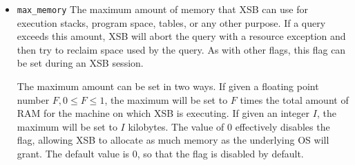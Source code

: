 \begin{description}
\begin{itemize}
\item {\tt max\_memory} The maximum amount of memory that XSB can use
  for  execution stacks, program space, tables, or any
  other purpose.
  If a query exceeds
  this amount, XSB will abort the query with a resource exception and
  then try to reclaim space used by the query.  As with other flags,
  this flag can be set during an XSB session.

  The maximum amount can be set in two ways.  If given a floating
  point number $F, 0 \le F \leq 1$, the maximum will be set to $F$
  times the total amount of RAM for the machine on which XSB is
  executing.  If given an integer $I$, the maximum will be set to $I$
  kilobytes.  The value of 0 effectively disables the flag, allowing
  XSB to allocate as much memory as the underlying OS will grant.  The
  default value is 0, so that the flag is disabled by default.
\end{itemize}

%
%


\end{description}
